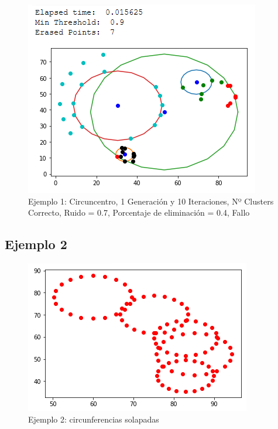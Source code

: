 \documentclass[conference,a4paper]{IEEEtran}
\begin{document}
\begin{figure}[H]
\centering
\includegraphics[scale=0.65]{Experimentacion/Ejemplo1/ej1_c_1_10_re_wrong}
\caption{Ejemplo 1: Circuncentro, 1 Generación y 10 Iteraciones,  Nº Clusters Correcto, Ruido = 0.7, Porcentaje de eliminación = 0.4, Fallo\\}
\end{figure}

\newpage
\subsection{Ejemplo 2}

\begin{figure}[H]
\centering
\includegraphics[scale=0.8]{Experimentacion/Ejemplo2/Ejemplo2}
\caption{Ejemplo 2: circunferencias solapadas}
\end{figure}
\end{document}
